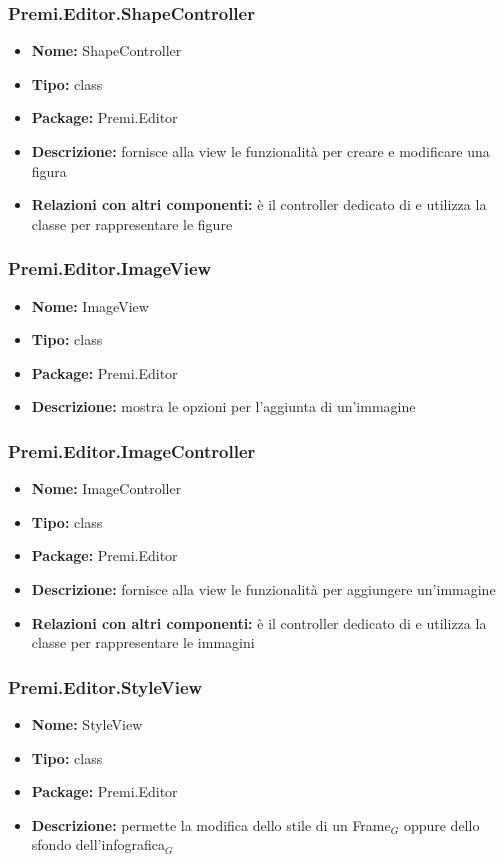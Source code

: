 \subsubsection{Premi.Editor.ShapeController}
\begin{itemize}
  \item \textbf{Nome:} ShapeController
  \item \textbf{Tipo:} class
  \item \textbf{Package:} Premi.Editor
  \item \textbf{Descrizione:} fornisce alla view le funzionalità per creare e modificare una figura
  \item \textbf{Relazioni con altri componenti:} è il controller dedicato di    e utilizza la classe  per rappresentare le figure
\end{itemize}
\subsubsection{Premi.Editor.ImageView}
\begin{itemize}
  \item \textbf{Nome:} ImageView
  \item \textbf{Tipo:} class
  \item \textbf{Package:} Premi.Editor
  \item \textbf{Descrizione:} mostra le opzioni per l'aggiunta di un'immagine
\end{itemize}
\subsubsection{Premi.Editor.ImageController}
\begin{itemize}
  \item \textbf{Nome:} ImageController
  \item \textbf{Tipo:} class
  \item \textbf{Package:} Premi.Editor
  \item \textbf{Descrizione:} fornisce alla view le funzionalità per aggiungere un'immagine
  \item \textbf{Relazioni con altri componenti:} è il controller dedicato di    e utilizza la classe  per rappresentare le immagini
\end{itemize}
\subsubsection{Premi.Editor.StyleView}
\begin{itemize}
  \item \textbf{Nome:} StyleView
  \item \textbf{Tipo:} class
  \item \textbf{Package:} Premi.Editor
  \item \textbf{Descrizione:} permette la modifica dello stile di un Frame$_G$ oppure dello sfondo dell'infografica$_G$
\end{itemize}
